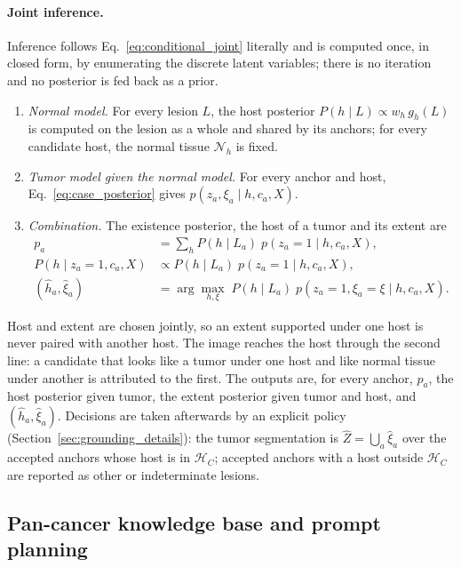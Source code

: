 \documentclass[fleqn,10pt]{olplainarticle}
\begin{document}
\paragraph{Joint inference.}
Inference follows Eq.~\eqref{eq:conditional_joint} literally and is computed once, in closed form, by enumerating the
discrete latent variables; there is no iteration and no posterior is fed back as a prior.
\begin{enumerate}
\item \emph{Normal model.} For every lesion $L$, the host posterior $P(h\mid L)\propto w_h\,g_h(L)$ is computed on the
lesion as a whole and shared by its anchors; for every candidate host, the normal tissue $\mathcal{N}_h$ is fixed.
\item \emph{Tumor model given the normal model.} For every anchor and host, Eq.~\eqref{eq:case_posterior} gives
$p(z_a,\xi_a\mid h,c_a,X)$.
\item \emph{Combination.} The existence posterior, the host of a tumor and its extent are
\begin{equation}
\label{eq:combination}
\begin{aligned}
p_a&=\textstyle\sum_h P(h\mid L_a)\;p(z_a=1\mid h,c_a,X),\\
P(h\mid z_a=1,c_a,X)&\propto P(h\mid L_a)\;p(z_a=1\mid h,c_a,X),\\
(\hat h_a,\hat\xi_a)&=\textstyle\arg\max_{h,\xi}\;P(h\mid L_a)\;p(z_a=1,\xi_a=\xi\mid h,c_a,X).
\end{aligned}
\end{equation}
\end{enumerate}
Host and extent are chosen jointly, so an extent supported under one host is never paired with another host. The image
reaches the host through the second line: a candidate that looks like a tumor under one host and like normal tissue under
another is attributed to the first. The outputs are, for every anchor, $p_a$, the host posterior given tumor, the extent
posterior given tumor and host, and $(\hat h_a,\hat\xi_a)$. Decisions are taken afterwards by an explicit policy
(Section~\ref{sec:grounding_details}): the tumor segmentation is $\hat Z=\bigcup_a\hat\xi_a$ over the accepted anchors
whose host is in $\mathcal{H}_C$; accepted anchors with a host outside $\mathcal{H}_C$ are reported as other or
indeterminate lesions.

\subsection{Pan-cancer knowledge base and prompt planning}
\label{sec:kb_planning}
\end{document}
